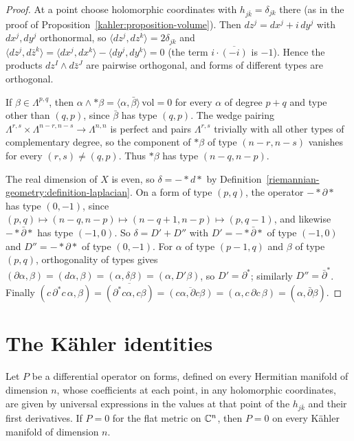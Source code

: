 \begin{proof}
At a point choose holomorphic coordinates with $h_{j\bar k} = \delta_{jk}$ there (as in the proof of
Proposition~\ref{kahler:proposition-volume}). Then $dz^j = dx^j + i\,dy^j$ with $dx^j, dy^j$ orthonormal, so
$\langle dz^j, dz^k\rangle = 2\delta_{jk}$ and $\langle dz^j, d\bar z^k\rangle = \langle dx^j, dx^k\rangle - \langle dy^j, dy^k\rangle = 0$
(the term $i \cdot \overline{(-i)}$ is $-1$). Hence the products $dz^I \wedge d\bar z^J$ are pairwise orthogonal, and forms of different
types are orthogonal.

If $\beta \in \Lambda^{p,q}$, then $\alpha \wedge *\beta = \langle\alpha, \bar\beta\rangle\,\mathrm{vol} = 0$ for every $\alpha$ of
degree $p + q$ and type other than $(q,p)$, since $\bar\beta$ has type $(q,p)$. The wedge pairing
$\Lambda^{r,s} \times \Lambda^{n-r,n-s} \to \Lambda^{n,n}$ is perfect and pairs $\Lambda^{r,s}$ trivially with all other types of
complementary degree, so the component of $*\beta$ of type $(n-r, n-s)$ vanishes for every $(r,s) \neq (q,p)$. Thus $*\beta$ has type
$(n-q, n-p)$.

The real dimension of $X$ is even, so $\delta = -*d*$ by Definition~\ref{riemannian-geometry:definition-laplacian}. On a form of type
$(p,q)$, the operator $-*\partial*$ has type $(0, -1)$, since $(p,q) \mapsto (n-q, n-p) \mapsto (n-q+1, n-p) \mapsto (p, q-1)$, and
likewise $-*\bar\partial*$ has type $(-1, 0)$. So $\delta = D' + D''$ with $D' = -*\bar\partial*$ of type $(-1,0)$ and $D'' = -*\partial*$
of type $(0,-1)$. For $\alpha$ of type $(p-1, q)$ and $\beta$ of type $(p,q)$, orthogonality of types gives
$(\partial\alpha, \beta) = (d\alpha, \beta) = (\alpha, \delta\beta) = (\alpha, D'\beta)$, so $D' = \partial^*$; similarly $D'' = \bar\partial^*$.
Finally $(c\,\partial^*c\,\alpha, \beta) = \overline{(\partial^*c\alpha, c\beta)} = \overline{(c\alpha, \partial c\beta)} = (\alpha, c\,\partial c\,\beta) = (\alpha, \bar\partial\beta)$.
\end{proof}

\section{The K\"ahler identities}\label{hodge-decomposition:section-kahler-identities}

\begin{lemma}\label{hodge-decomposition:lemma-osculation-principle}
Let $P$ be a differential operator on forms, defined on every Hermitian manifold of dimension $n$, whose coefficients at each point, in
any holomorphic coordinates, are given by universal expressions in the values at that point of the $h_{j\bar k}$ and their first
derivatives. If $P = 0$ for the flat metric on $\mathbb{C}^n$, then $P = 0$ on every K\"ahler manifold of dimension $n$.
\end{lemma}

